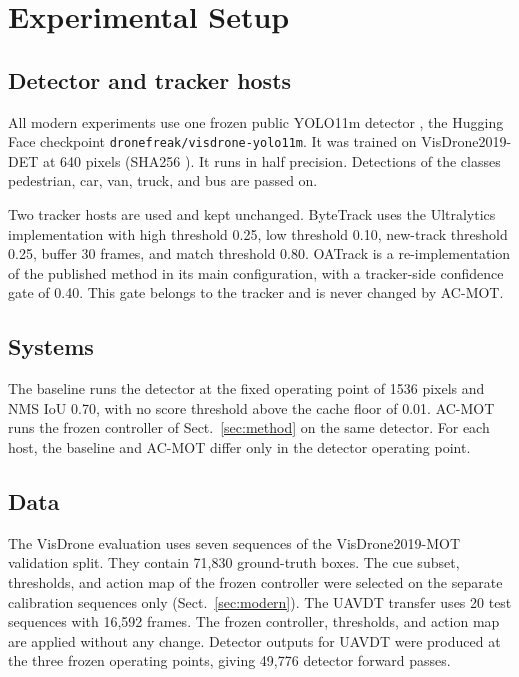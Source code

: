 \section{Experimental Setup}\label{sec:setup}

\subsection{Detector and tracker hosts}
All modern experiments use one frozen public YOLO11m detector
\cite{jocher2024yolo11}, the
Hugging Face checkpoint \texttt{dronefreak/\allowbreak visdrone-\allowbreak yolo11m}. It was
trained on VisDrone2019-DET at 640 pixels (SHA256 \checkpointsha). It runs in half precision. Detections of the
classes pedestrian, car, van, truck, and bus are passed on.

Two tracker hosts are used and kept unchanged. ByteTrack uses the Ultralytics
implementation with high threshold 0.25, low threshold 0.10, new-track
threshold 0.25, buffer 30 frames, and match threshold 0.80. OATrack is a
re-implementation of the published method \cite{qi2026oatrack} in its main
configuration, with a tracker-side confidence gate of 0.40. This gate belongs
to the tracker and is never changed by AC-MOT.

\subsection{Systems}
The baseline runs the detector at the fixed operating point of 1536 pixels and
NMS IoU 0.70, with no score threshold above the cache floor of 0.01. AC-MOT
runs the frozen controller of Sect.~\ref{sec:method} on the same detector. For
each host, the baseline and AC-MOT differ only in the detector operating
point.

\subsection{Data}
The VisDrone evaluation uses seven sequences of the VisDrone2019-MOT
validation split. They contain 71,830 ground-truth boxes. The cue subset,
thresholds, and action map of the frozen controller were selected on the
separate calibration sequences only (Sect.~\ref{sec:modern}). The UAVDT transfer uses 20 test
sequences with 16,592 frames. The frozen controller, thresholds, and action
map are applied without any change. Detector outputs for UAVDT were produced
at the three frozen operating points, giving 49,776 detector forward passes.

